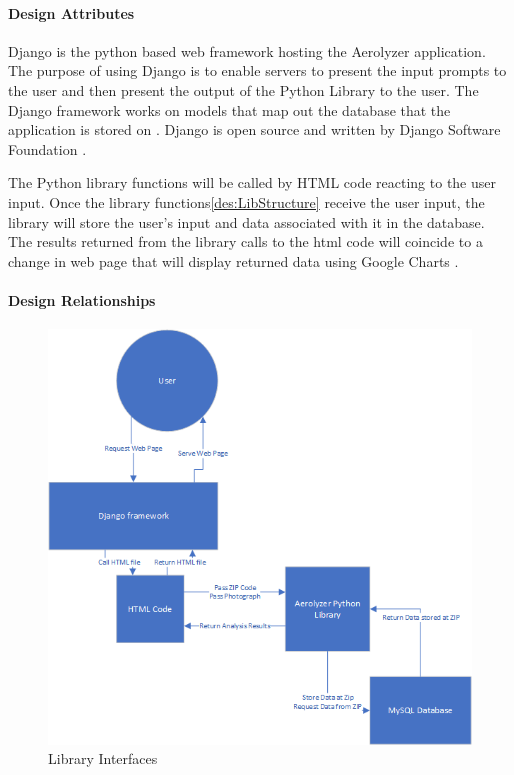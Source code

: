 \documentclass[onecolumn, draftclsnofoot,10pt, compsoc]{IEEEtran}
\begin{document}
\begin{singlespace}
          \paragraph{Design Attributes}
          Django is the python based web framework hosting the Aerolyzer application\cite{DjangoStart}.
          The purpose of using Django is to enable servers to present the input prompts to the user and then present the output of the Python Library to the user.
          The Django framework works on models that map out the database that the application is stored on \cite{DjangoDoc}.
          Django is open source and written by Django Software Foundation \cite{DjangoOver}.
		  
          The Python library functions will be called by HTML code reacting to the user input.
		  Once the library functions\ref{des:LibStructure} receive the user input, the library will store the user’s input and data associated with it in the database.
		  The results returned from the library calls to the html code will coincide to a change in web page that will display returned data using Google Charts \cite{GoogleCh}.
          \paragraph{Design Relationships}
            \begin{figure}[h]
            	\centering
                \includegraphics[width=4.5in,natwidth=600,natheight=588]{images/DesignInterface.png}
                \caption{Library Interfaces}
                \label{fig:1}
            \end{figure}

\end{singlespace}
\end{document}
